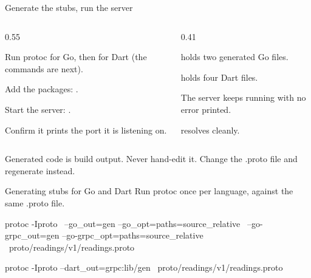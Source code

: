 \documentclass[10pt,aspectratio=169,t]{beamer}
\begin{document}
\begin{frame}[fragile,eyebrow=Task I]{Generate the stubs, run the server}
  \begin{columns}[T]
    \begin{column}{0.55\textwidth}
      \begin{steps}
        \item Run protoc for Go, then for Dart (the commands are next).
        \item Add the packages: .
        \item Start the server: .
        \item Confirm it prints the port it is listening on.
      \end{steps}
    \end{column}
    \begin{column}{0.41\textwidth}
      \begin{checklist}
        \item {} holds two generated Go files.
        \item {} holds four Dart files.
        \item The server keeps running with no error printed.
        \item {} resolves cleanly.
      \end{checklist}
    \end{column}
  \end{columns}
  \begin{takeaway}{Generated code is build output.}
    Never hand-edit it. Change the .proto file and regenerate instead.
  \end{takeaway}
\end{frame}

\begin{frame}[fragile,eyebrow=Task I]{Generating stubs for Go and Dart}
  \vskip 1mm
  Run protoc once per language, against the same .proto file.
\begin{shell}
protoc -Iproto \
  --go_out=gen      --go_opt=paths=source_relative \
  --go-grpc_out=gen --go-grpc_opt=paths=source_relative \
  proto/readings/v1/readings.proto

protoc -Iproto --dart_out=grpc:lib/gen \
  proto/readings/v1/readings.proto
\end{shell}
\end{frame}
\end{document}
